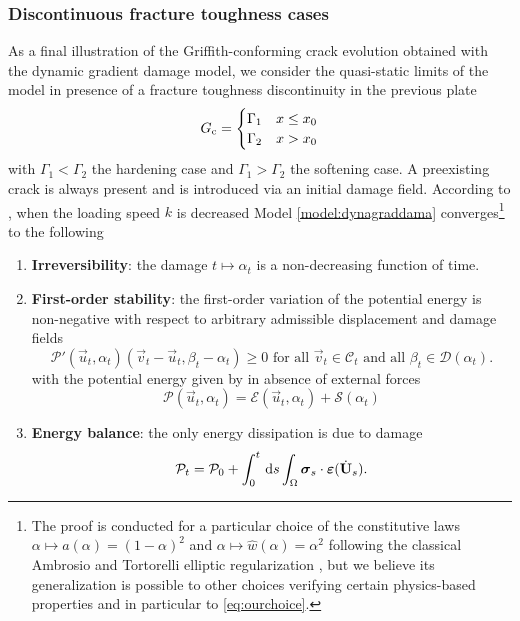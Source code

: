 \subsubsection{Discontinuous fracture toughness cases}
As a final illustration of the Griffith-conforming crack evolution obtained with the dynamic gradient damage model, we consider the quasi-static limits of the model in presence of a fracture toughness discontinuity in the previous plate
\[
G_\mathrm{c}=\begin{cases}
\Gamma_1 & x\leq x_0 \\
\Gamma_2 & x>x_0
\end{cases}
\]
with $\Gamma_1<\Gamma_2$ the hardening case and $\Gamma_1>\Gamma_2$ the softening case. A preexisting crack is always present and is introduced via an initial damage field. According to \cite{Versieux:2015}, when the loading speed $k$ is decreased Model \ref{model:dynagraddama} converges\footnote{The proof is conducted for a particular choice of the constitutive laws $\alpha\mapsto a(\alpha)=(1-\alpha)^2$ and $\alpha\mapsto\widehat{w}(\alpha)=\alpha^2$ following the classical Ambrosio and Tortorelli elliptic regularization \cite{BourdinFrancfortMarigo:2000}, but we believe its generalization is possible to other choices verifying certain physics-based properties \cite{PhamAmorMarigoMaurini:2011} and in particular to \eqref{eq:ourchoice}.} to the following
\begin{model} \label{model:qsgraddama}
\begin{enumerate}
\item \textbf{Irreversibility}: the damage $t\mapsto\alpha_t$ is a non-decreasing function of time.
\item \textbf{First-order stability}: the first-order variation of the potential energy is non-negative with respect to arbitrary admissible displacement and damage fields
\begin{equation} \label{eq:viqs}
\mathcal{P}'(\vec{u}_t,\alpha_t)(\vec{v}_t-\vec{u}_t,\beta_t-\alpha_t)\geq 0\text{ for all $\vec{v}_t\in\mathcal{C}_t$ and all $\beta_t\in\mathcal{D}(\alpha_t)$}.
\end{equation}
with the potential energy given by in absence of external forces
\[
\mathcal{P}(\vec{u}_t,\alpha_t)=\mathcal{E}(\vec{u}_t,\alpha_t)+\mathcal{S}(\alpha_t)
\]
\item \textbf{Energy balance}: the only energy dissipation is due to damage
\begin{equation} \label{eq:qsgdeb}
\mathcal{P}_t=\mathcal{P}_0+\int_0^t\D{s}\int_\Omega\sig_s\cdot\eps(\dot{\vec{U}}_s).
\end{equation}
\end{enumerate}
\end{model}

